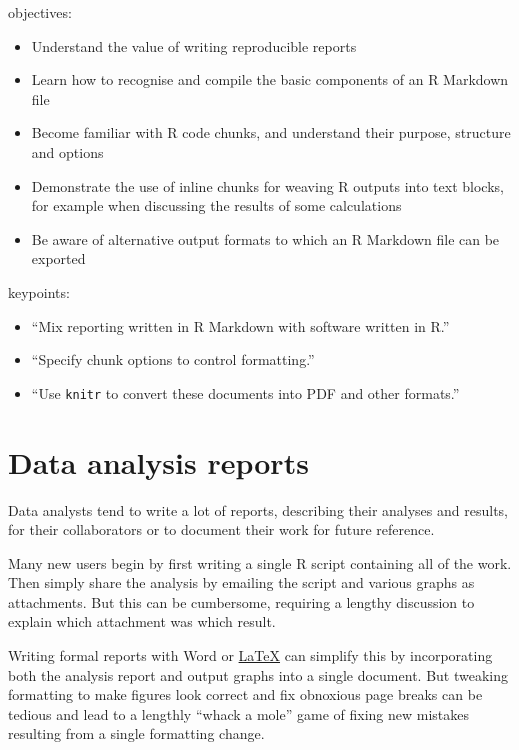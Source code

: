 \documentclass[]{book}
\providecommand{\tightlist}{%
  \setlength{\itemsep}{0pt}\setlength{\parskip}{0pt}}
\begin{document}
objectives:

\begin{itemize}
\tightlist
\item
  Understand the value of writing reproducible reports\\
\item
  Learn how to recognise and compile the basic components of an R
  Markdown file\\
\item
  Become familiar with R code chunks, and understand their purpose,
  structure and options\\
\item
  Demonstrate the use of inline chunks for weaving R outputs into text
  blocks, for example when discussing the results of some calculations\\
\item
  Be aware of alternative output formats to which an R Markdown file can
  be exported
\end{itemize}

keypoints:

\begin{itemize}
\tightlist
\item
  ``Mix reporting written in R Markdown with software written in R.''\\
\item
  ``Specify chunk options to control formatting.''\\
\item
  ``Use \texttt{knitr} to convert these documents into PDF and other
  formats.''
\end{itemize}

\section{Data analysis reports}\label{data-analysis-reports}

Data analysts tend to write a lot of reports, describing their analyses
and results, for their collaborators or to document their work for
future reference.

Many new users begin by first writing a single R script containing all
of the work. Then simply share the analysis by emailing the script and
various graphs as attachments. But this can be cumbersome, requiring a
lengthy discussion to explain which attachment was which result.

Writing formal reports with Word or
\href{http://www.latex-project.org/}{LaTeX} can simplify this by
incorporating both the analysis report and output graphs into a single
document. But tweaking formatting to make figures look correct and fix
obnoxious page breaks can be tedious and lead to a lengthly ``whack a
mole'' game of fixing new mistakes resulting from a single formatting
change.
\end{document}
